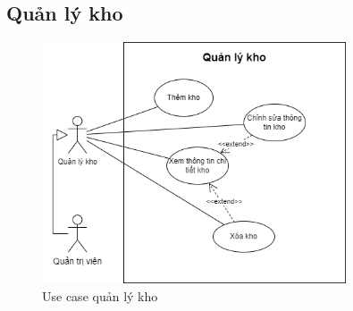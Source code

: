 \newpage
    


    \subsection{Quản lý kho}
        \begin{figure}[!htp]
            \centering
            \includegraphics[width=9cm]{img/UseCase/UseCase-Quản lý kho.drawio.png}
            \newline
            \caption{Use case quản lý kho}
        \end{figure}
    
